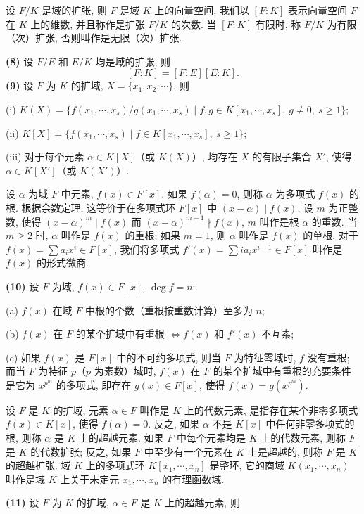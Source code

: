 设 $F/K$ 是域的扩张, 则 $F$ 是域 $K$ 上的向量空间, 我们以 $[F:K]$ 表示向量空间 $F$ 在 $K$ 上的维数, 并且称作是扩张 $F/K$ 的次数. 当 $[F:K]$ 有限时, 称 $F/K$ 为有限（次）扩张, 否则叫作是无限（次）扩张.

\textbf{(8)} 设 $F/E$ 和 $E/K$ 均是域的扩张, 则
\[
  [F:K]=[F:E][E:K].
\]
\textbf{(9)} 设 $F$ 为 $K$ 的扩域, $X=\{x_1,x_2,\cdots\}$, 则

(i) $K(X)=\{f(x_1,\cdots,x_s)/g(x_1,\cdots,x_s)\mid f,g\in K[x_1,\cdots,x_s],\ g\neq 0,\ s\geqslant 1\}$;

(ii) $K[X]=\{f(x_1,\cdots,x_s)\mid f\in K[x_1,\cdots,x_s],\ s\geqslant 1\}$;

(iii) 对于每个元素 $\alpha\in K[X]$（或 $K(X)$）, 均存在 $X$ 的有限子集合 $X'$, 使得 $\alpha\in K[X']$（或 $K(X')$）.

设 $\alpha$ 为域 $F$ 中元素, $f(x)\in F[x]$. 如果 $f(\alpha)=0$, 则称 $\alpha$ 为多项式 $f(x)$ 的根. 根据余数定理, 这等价于在多项式环 $F[x]$ 中 $(x-\alpha)\mid f(x)$. 设 $m$ 为正整数, 使得 $(x-\alpha)^m\mid f(x)$ 而 $(x-\alpha)^{m+1}\nmid f(x)$, $m$ 叫作是根 $\alpha$ 的重数. 当 $m\geqslant 2$ 时, $\alpha$ 叫作是 $f(x)$ 的重根; 如果 $m=1$, 则 $\alpha$ 叫作是 $f(x)$ 的单根. 对于 $f(x)=\sum a_ix^i\in F[x]$, 我们将多项式 $f'(x)=\sum ia_ix^{i-1}\in F[x]$ 叫作是 $f(x)$ 的形式微商.

\textbf{(10)} 设 $F$ 为域, $f(x)\in F[x]$, $\deg f=n$:

(a) $f(x)$ 在域 $F$ 中根的个数（重根按重数计算）至多为 $n$;

(b) $f(x)$ 在 $F$ 的某个扩域中有重根 $\Leftrightarrow f(x)$ 和 $f'(x)$ 不互素;

(c) 如果 $f(x)$ 是 $F[x]$ 中的不可约多项式, 则当 $F$ 为特征零域时, $f$ 没有重根; 而当 $F$ 为特征 $p$（$p$ 为素数）域时, $f(x)$ 在 $F$ 的某个扩域中有重根的充要条件是它为 $x^{p^m}$ 的多项式, 即存在 $g(x)\in F[x]$, 使得 $f(x)=g(x^{p^m})$.

设 $F$ 是 $K$ 的扩域, 元素 $\alpha\in F$ 叫作是 $K$ 上的代数元素, 是指存在某个非零多项式 $f(x)\in K[x]$, 使得 $f(\alpha)=0$. 反之, 如果 $\alpha$ 不是 $K[x]$ 中任何非零多项式的根, 则称 $\alpha$ 是 $K$ 上的超越元素. 如果 $F$ 中每个元素均是 $K$ 上的代数元素, 则称 $F$ 是 $K$ 的代数扩张; 反之, 如果 $F$ 中至少有一个元素在 $K$ 上是超越的, 则称 $F$ 是 $K$ 的超越扩张. 域 $K$ 上的多项式环 $K[x_1,\cdots,x_n]$ 是整环, 它的商域 $K(x_1,\cdots,x_n)$ 叫作是域 $K$ 上关于未定元 $x_1,\cdots,x_n$ 的有理函数域.

\textbf{(11)} 设 $F$ 为 $K$ 的扩域, $\alpha\in F$ 是 $K$ 上的超越元素, 则

